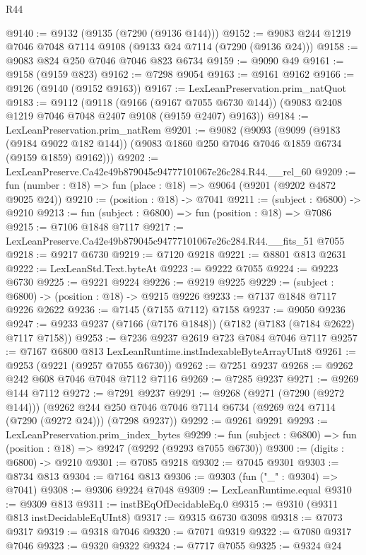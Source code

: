 \begin{lexlean}{R44}
\begin{coremodule}
{@9140 := @9132 (@9135 (@7290 (@9136 @144)))
@9152 := @9083 @244 @1219 @7046 @7048 @7114 @9108 (@9133 @24 @7114 (@7290 (@9136 @24)))
@9158 := @9083 @824 @250 @7046 @7046 @823 @6734
@9159 := @9090 @49
@9161 := @9158 (@9159 @823)
@9162 := @7298 @9054
@9163 := @9161 @9162
@9166 := @9126 (@9140 (@9152 @9163))
@9167 := LexLeanPreservation.prim_natQuot
@9183 := @9112
    (@9118
      (@9166 (@9167 @7055 @6730 @144))
      (@9083 @2408 @1219 @7046 @7048 @2407 @9108 (@9159 @2407) @9163))
@9184 := LexLeanPreservation.prim_natRem
@9201 := @9082
    (@9093
      (@9099
        (@9183 (@9184 @9022 @182 @144))
        (@9083 @1860 @250 @7046 @7046 @1859 @6734 (@9159 @1859) @9162)))
@9202 := LexLeanPreserve.Ca42e49b879045c94777101067e26c284.R44.__rel_60
@9209 := fun (number : @18) => fun (place : @18) => @9064 (@9201 (@9202 @4872 @9025 @24))
@9210 := (position : @18) -> @7041
@9211 := (subject : @6800) -> @9210
@9213 := fun (subject : @6800) => fun (position : @18) => @7086
@9215 := @7106 @1848 @7117
@9217 := LexLeanPreserve.Ca42e49b879045c94777101067e26c284.R44.__fits_51 @7055
@9218 := @9217 @6730
@9219 := @7120 @9218
@9221 := @8801 @813 @2631
@9222 := LexLeanStd.Text.byteAt
@9223 := @9222 @7055
@9224 := @9223 @6730
@9225 := @9221 @9224
@9226 := @9219 @9225
@9229 := (subject : @6800) -> (position : @18) -> @9215 @9226
@9233 := @7137 @1848 @7117 @9226 @2622
@9236 := @7145 (@7155 @7112) @7158
@9237 := @9050 @9236
@9247 := @9233 @9237 (@7166 (@7176 @1848)) (@7182 (@7183 (@7184 @2622) @7117 @7158))
@9253 := @7236 @9237 @2619 @723 @7084 @7046 @7117
@9257 := @7167 @6800 @813 LexLeanRuntime.instIndexableByteArrayUInt8
@9261 := @9253 (@9221 (@9257 @7055 @6730))
@9262 := @7251 @9237
@9268 := @9262 @242 @608 @7046 @7048 @7112 @7116
@9269 := @7285 @9237
@9271 := @9269 @144 @7112
@9272 := @7291 @9237
@9291 := @9268
    (@9271 (@7290 (@9272 @144)))
    (@9262 @244 @250 @7046 @7046 @7114 @6734 (@9269 @24 @7114 (@7290 (@9272 @24))) (@7298 @9237))
@9292 := @9261 @9291
@9293 := LexLeanPreservation.prim_index_bytes
@9299 := fun (subject : @6800) => fun (position : @18) => @9247 (@9292 (@9293 @7055 @6730))
@9300 := (digits : @6800) -> @9210
@9301 := @7085 @9218
@9302 := @7045 @9301
@9303 := @8734 @813
@9304 := @7164 @813
@9306 := @9303 (fun ("_" : @9304) => @7041)
@9308 := @9306 @9224 @7048
@9309 := LexLeanRuntime.equal
@9310 := @9309 @813
@9311 := instBEqOfDecidableEq.{0}
@9315 := @9310 (@9311 @813 instDecidableEqUInt8)
@9317 := @9315 @6730 @3098
@9318 := @7073 @9317
@9319 := @9318 @7046
@9320 := @7071 @9319
@9322 := @7080 @9317 @7046
@9323 := @9320 @9322
@9324 := @7717 @7055
@9325 := @9324 @24
}
\end{coremodule}
\end{lexlean}
